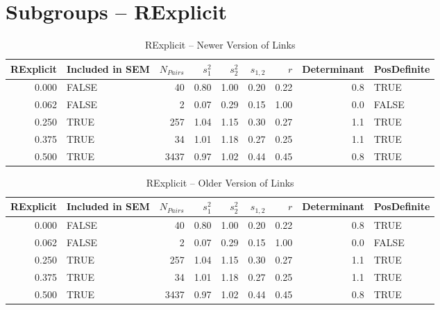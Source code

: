 \documentclass{article}\usepackage[]{graphicx}\usepackage[]{color}
\begin{document}
\section{Subgroups --  RExplicit }%
\begin{table}[ht]
\centering
\begin{tabular}{rlrrrrrrl}
  \hline
RExplicit & Included in SEM & $N_{Pairs}$ & $s_1^2$ & $s_2^2$ & $s_{1,2}$ & $r$ & Determinant & PosDefinite \\ 
  \hline
0.000 & FALSE & 40 & 0.80 & 1.00 & 0.20 & 0.22 & 0.8 & TRUE \\ 
  0.062 & FALSE & 2 & 0.07 & 0.29 & 0.15 & 1.00 & 0.0 & FALSE \\ 
  0.250 & TRUE & 257 & 1.04 & 1.15 & 0.30 & 0.27 & 1.1 & TRUE \\ 
  0.375 & TRUE & 34 & 1.01 & 1.18 & 0.27 & 0.25 & 1.1 & TRUE \\ 
  0.500 & TRUE & 3437 & 0.97 & 1.02 & 0.44 & 0.45 & 0.8 & TRUE \\ 
   \hline
\end{tabular}
\caption{RExplicit -- Newer Version of Links} 
\end{table}
\begin{table}[ht]
\centering
\begin{tabular}{rlrrrrrrl}
  \hline
RExplicit & Included in SEM & $N_{Pairs}$ & $s_1^2$ & $s_2^2$ & $s_{1,2}$ & $r$ & Determinant & PosDefinite \\ 
  \hline
0.000 & FALSE & 40 & 0.80 & 1.00 & 0.20 & 0.22 & 0.8 & TRUE \\ 
  0.062 & FALSE & 2 & 0.07 & 0.29 & 0.15 & 1.00 & 0.0 & FALSE \\ 
  0.250 & TRUE & 257 & 1.04 & 1.15 & 0.30 & 0.27 & 1.1 & TRUE \\ 
  0.375 & TRUE & 34 & 1.01 & 1.18 & 0.27 & 0.25 & 1.1 & TRUE \\ 
  0.500 & TRUE & 3437 & 0.97 & 1.02 & 0.44 & 0.45 & 0.8 & TRUE \\ 
   \hline
\end{tabular}
\caption{RExplicit -- Older Version of Links} 
\end{table}
\newpage 
\end{document}
